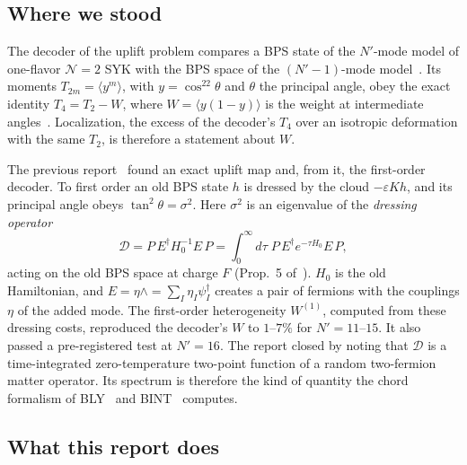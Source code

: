 \documentclass[11pt]{article}
\newcommand{\Np}{N'}
\newcommand{\eps}{\varepsilon}
\newcommand{\Dc}{\mathcal D}
\newcommand{\Wone}{W^{(1)}}
\theoremstyle{plain}
\theoremstyle{remark}
\numberwithin{equation}{section}
\begin{document}
\subsection{Where we stood}

The decoder of the uplift problem compares a BPS state of the $\Np$-mode model of one-flavor $\mathcal N=2$ SYK with the
BPS space of the $(\Np-1)$-mode model~\cite{CV,prog1013}. Its moments $T_{2m}=\langle y^m\rangle$, with $y=\cos^22\theta$
and $\theta$ the principal angle, obey the exact identity $T_4=T_2-W$, where $W=\langle y(1-y)\rangle$ is the weight at
intermediate angles~\cite[\S9]{prog1013}. Localization, the excess of the decoder's $T_4$ over an isotropic deformation
with the same $T_2$, is therefore a statement about $W$.

The previous report~\cite{prog1013} found an exact uplift map and, from it, the first-order decoder. To first order an
old BPS state $h$ is dressed by the cloud $-\eps Kh$, and its principal angle obeys $\tan^2\theta=\sigma^2$. Here
$\sigma^2$ is an eigenvalue of the \emph{dressing operator}
\begin{equation}\label{eq:D}
\Dc=P\,E^\dagger H_0^{-1}E\,P=\int_0^\infty d\tau\;P\,E^\dagger e^{-\tau H_0}E\,P ,
\end{equation}
acting on the old BPS space at charge $F$ (Prop.~5 of~\cite{prog1013}). $H_0$ is the old Hamiltonian, and
$E=\eta\wedge=\sum_I\eta_I\psi_I^\dagger$ creates a pair of fermions with the couplings $\eta$ of the added mode. The
first-order heterogeneity $\Wone$, computed from these dressing costs, reproduced the decoder's $W$ to $1$--$7\%$ for
$\Np=11$--$15$. It also passed a pre-registered test at $\Np=16$. The report closed by noting that $\Dc$ is a
time-integrated zero-temperature two-point function of a random two-fermion matter operator. Its spectrum is therefore
the kind of quantity the chord formalism of BLY~\cite{BLY} and BINT~\cite{BINT} computes.

\subsection{What this report does}
\end{document}

